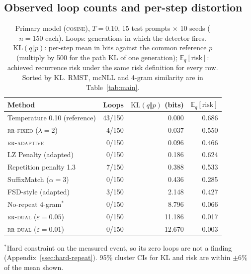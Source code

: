 \documentclass[make,article,submit,pdftex]{Definitions/mdpi}
\providecommand{\KL}{}\renewcommand{\KL}{\mathrm{KL}}
\providecommand{\E}{}\renewcommand{\E}{\mathbb{E}}
\begin{document}
\subsection{Observed loop counts and per-step distortion}\label{ssec:common-kl}
\begin{table}[H]
\centering
\caption{Primary model (\textsc{cosine}), $T{=}0.10$, 15 test prompts $\times$ 10 seeds ($n{=}150$ each). Loops: generations in which the detector fires. $\KL(q\Vert p)$: per-step mean in bits against the common reference $p$ (multiply by 500 for the path KL of one generation); $\E_q[\mathrm{risk}]$: achieved recurrence risk under the same risk definition for every row. Sorted by KL. RMST, mcNLL and 4-gram similarity are in Table~\ref{tab:main}.}
\label{tab:primary}
\begin{tabular}{@{}lrrr@{}}
\toprule
Method & Loops & $\KL(q\Vert p)$ (bits) & $\E_q[\mathrm{risk}]$ \\
\midrule
Temperature 0.10 (reference) & 43/150 & 0.000 & 0.686 \\
\textsc{rr-fixed} ($\lambda{=}2$) & 4/150 & 0.037 & 0.550 \\
\textsc{rr-adaptive} & 0/150 & 0.096 & 0.466 \\
LZ Penalty (adapted) & 0/150 & 0.186 & 0.624 \\
Repetition penalty 1.3 & 7/150 & 0.388 & 0.533 \\
SuffixMatch ($\alpha{=}3$) & 0/150 & 0.436 & 0.285 \\
FSD-style (adapted) & 3/150 & 2.148 & 0.427 \\
No-repeat 4-gram$^{*}$ & 0/150 & 8.796 & 0.066 \\
\textsc{rr-dual} ($\varepsilon{=}0.05$) & 0/150 & 11.186 & 0.017 \\
\textsc{rr-dual} ($\varepsilon{=}0.01$) & 0/150 & 12.670 & 0.003 \\
\bottomrule
\end{tabular}

\vspace{4pt}
{\footnotesize $^{*}$Hard constraint on the measured event, so its zero loops are not a finding (Appendix~\ref{ssec:hard-repeat}). 95\% cluster CIs for KL and risk are within $\pm$6\% of the mean shown.}
\end{table}
\end{document}
